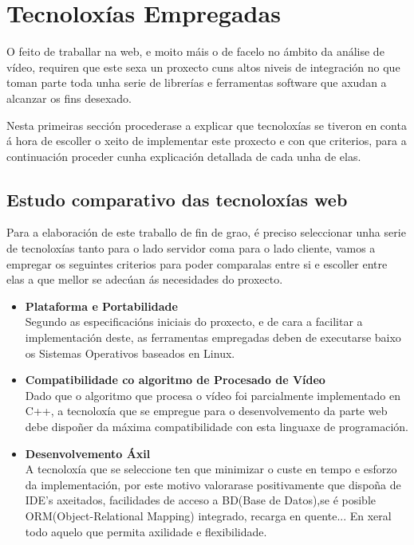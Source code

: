 \chapter{Tecnoloxías Empregadas}
    
    O feito de traballar na web, e moito máis o de facelo no ámbito da análise de vídeo, requiren 
    que este sexa un proxecto cuns altos niveis de integración no que toman parte toda unha serie 
    de librerías e ferramentas software que axudan a alcanzar os fins desexado.
    
    Nesta primeiras sección procederase a explicar que tecnoloxías se tiveron en conta á hora de 
    escoller o xeito de implementar este proxecto e con que criterios, para a continuación proceder
    cunha explicación detallada de cada unha de elas. 
    
    \section{Estudo comparativo das tecnoloxías web}
    \label{sec:estudoTecnoloxias}
    Para a elaboración de este traballo de fin de grao, é preciso seleccionar unha serie de
    tecnoloxías tanto para o lado servidor coma para o lado cliente, vamos a empregar os seguintes
    criterios para poder comparalas entre si e escoller entre elas a que mellor se adecúan ás 
    necesidades do proxecto.

    \begin{itemize}

        \item {\textbf{Plataforma e Portabilidade\\}}
            Segundo as especificacións iniciais do proxecto, e de cara a facilitar a 
            implementación deste, as ferramentas empregadas deben de executarse baixo os
            Sistemas Operativos baseados en Linux.

        \item {\textbf{Compatibilidade co algoritmo de Procesado de Vídeo\\}}
            Dado que o algoritmo que procesa o vídeo foi parcialmente implementado en C++,
            a tecnoloxía que se empregue para o desenvolvemento da parte web debe dispoñer da
            máxima compatibilidade con esta linguaxe de programación.

        \item {\textbf{Desenvolvemento Áxil\\}}
            A tecnoloxía que se seleccione ten que minimizar o custe en tempo e esforzo da 
            implementación, por este motivo valorarase positivamente que dispoña de IDE's axeitados,
            facilidades de acceso a BD(Base de Datos),se é posible ORM(Object-Relational Mapping) 
            integrado, recarga en quente... En xeral todo aquelo que permita axilidade e flexibilidade.

    \end{itemize}

